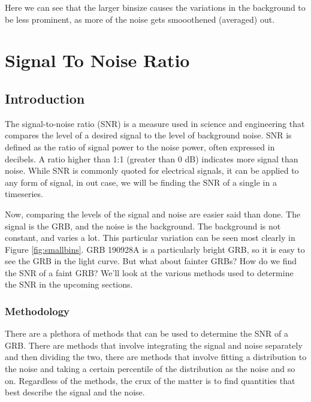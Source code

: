 \documentclass[11pt]{book} %
\begin{document}
Here we can see that the larger binsize causes the variations in the background to be less prominent, as more of the noise gets smooothened (averaged) out.


\chapter{Signal To Noise Ratio}

\section{Introduction}

The signal-to-noise ratio (SNR) is a measure used in science and engineering that compares the level of a desired signal to the level of background noise. SNR is defined as the ratio of signal power to the noise power, often expressed in decibels. A ratio higher than 1:1 (greater than 0 dB) indicates more signal than noise. While SNR is commonly quoted for electrical signals, it can be applied to any form of signal, in out case, we will be finding the SNR of a single in a timeseries. 

%

Now, comparing the levels of the signal and noise are easier said than done. The signal is the GRB, and the noise is the background. The background is not constant, and varies a lot. This particular variation can be seen most clearly in Figure \ref{fig:smallbins}. GRB 190928A is a particularly bright GRB, so it is easy to see the GRB in the light curve. But what about fainter GRBs? How do we find the SNR of a faint GRB? We'll look at the various methods used to determine the SNR in the upcoming sections.


\subsection{Methodology}
There are a plethora of methods that can be used to determine the SNR of a GRB. There are methods that involve integrating the signal and noise separately and then dividing the two, there are methods that involve fitting a distribution to the noise and taking a certain percentile of the distribution as the noise and so on. Regardless of the methods, the crux of the matter is to find quantities that best describe the signal and the noise.
\end{document}
